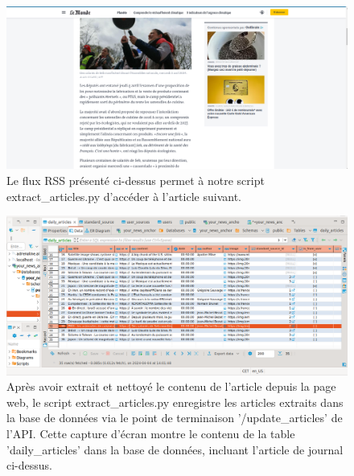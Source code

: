 \documentclass[french]{article}
\begin{document}
    \begin{figure}[h!]
        \includegraphics[width=12cm]{original_website}
        \centering
        \caption{Le flux RSS présenté ci-dessus permet à notre script extract\_articles.py d'accéder à l'article suivant.}
        \centering
    \end{figure}
    \begin{figure}[h!]
        \includegraphics[width=12cm]{db_2}
        \centering
        \caption{Après avoir extrait et nettoyé le contenu de l'article depuis la page web, le script extract\_articles.py enregistre les articles extraits dans la base de données via le point de terminaison '/update\_articles' de l'API. Cette capture d'écran montre le contenu de la table 'daily\_articles' dans la base de données, incluant l'article de journal ci-dessus.}
        \centering
    \end{figure}
\end{document}
